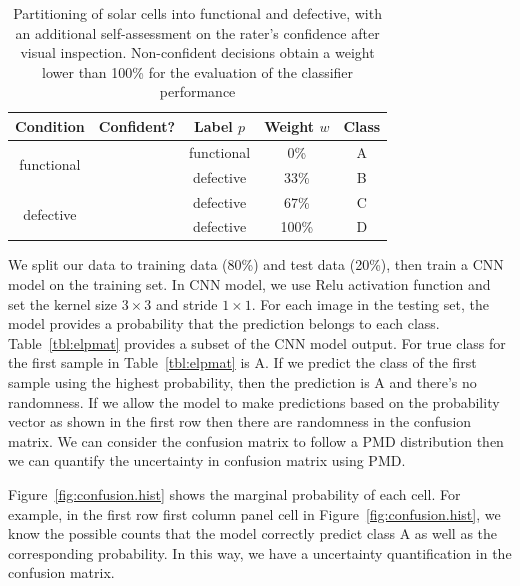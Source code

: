 \documentclass[12pt]{article}
\newcommand{\cmark}{\ding{51}}%
\newcommand{\xmark}{\ding{55}}%
\begin{document}
\begin{table}[h!]
	\centering
	\caption{Partitioning of solar cells into functional and defective, with an additional self-assessment on the rater's confidence after visual inspection. Non-confident decisions obtain a weight lower than 100\% for the evaluation of the classifier performance }
	\begin{tabular}{c|c|c|c|c}
		\hline
		\hline
		Condition  & Confident?  &  Label $p$ & Weight $w$ & Class \\
		\hline
		\multirow{2}{*}{functional} & \cmark & functional & 0\% & A\\
		& \xmark& defective  & 33\% & B\\
		\hline
		\multirow{2}{*}{defective} & \xmark & defective & 67\% & C\\
		& \cmark & defective & 100\%  &D\\
		\hline
		\hline
	\end{tabular}
	
	
	
	\label{tbl:el.label}
	
\end{table}

We split our data to training data (80\%) and test data (20\%), then train a CNN model on the training set. In CNN model, we use Relu activation function and set the kernel size $3 \times 3$ and stride $1 \times 1$. For each image in the testing set, the model provides a probability that the prediction belongs to each class. Table~\ref{tbl:elpmat} provides a subset of the CNN model output. For true class for the first sample in Table~\ref{tbl:elpmat} is A. If we predict the class of the first sample using the highest probability, then the prediction is A and there's no randomness. If we allow the model to make predictions based on the probability vector as shown in the first row then there are randomness in the confusion matrix. We can consider the confusion matrix to follow a PMD distribution then we can quantify the uncertainty in confusion matrix using PMD.

Figure~\ref{fig:confusion.hist} shows the marginal probability of each cell. For example, in the first row first column panel cell in Figure~\ref{fig:confusion.hist}, we know the possible counts that the model correctly predict class A as well as the corresponding probability. In this way, we have a uncertainty quantification in the confusion matrix.
\end{document}
